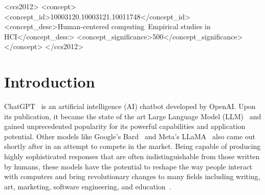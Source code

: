 \documentclass[manuscript,screen,nonacm]{acmart}
\begin{document}
\begin{CCSXML}
<ccs2012>
   <concept>
       <concept_id>10003120.10003121.10011748</concept_id>
       <concept_desc>Human-centered computing~Empirical studies in HCI</concept_desc>
       <concept_significance>500</concept_significance>
       </concept>
 </ccs2012>
\end{CCSXML}








\maketitle

\section{Introduction}
ChatGPT~\cite{openai2021chatgpt} is an artificial intelligence (AI) chatbot developed by OpenAI. Upon its publication, it became the state of the art Large Language Model (LLM)~\cite{halevy2009unreasonable} and gained unprecedented popularity for its powerful capabilities and application potential. Other models like Google’s Bard~\cite{collins2021lamda} and Meta’s LLaMA~\cite{meta2023introducing} also came out shortly after in an attempt to compete in the market. Being capable of producing highly sophisticated responses that are often indistinguishable from those written by humans, these models have the potential to reshape the way people interact with computers and bring revolutionary changes to many fields including writing, art, marketing, software engineering, and education~\cite{fraiwan2023review}.
\end{document}
